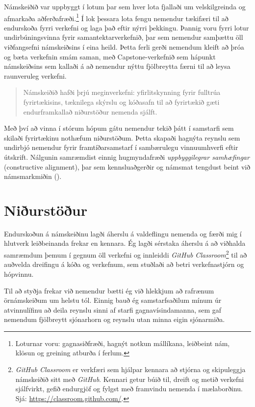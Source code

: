 \documentclass{kennsluakademia_conf}
\begin{document}
Námskeiðið var uppbyggt í lotum þar sem hver lota fjallaði um
velskilgreinda og afmarkaða aðferðafræði.\footnote{Loturnar voru:
  gagnasiðfræði, hagnýt notkun mállíkana, leiðbeint nám, klösun og
  greining atburða í ferlum.} Í lok þessara lota fengu nemendur tækifæri
til að endurskoða fyrri verkefni og laga það eftir nýrri þekkingu.
Þannig voru fyrri lotur undirbúningsvinna fyrir samantektarverkefnið,
þar sem nemendur samþættu öll viðfangsefni námskeiðsins í eina heild.
Þetta ferli gerði nemendum kleift að þróa og bæta verkefnin smám saman,
með Capstone-verkefnið sem hápunkt námskeiðsins sem kallaði á að
nemendur nýttu fjölbreytta færni til að leysa raunveruleg verkefni.

\begin{quote}
Námskeiðið hafði þrjú meginverkefni: yfirlitskynning fyrir fulltrúa
fyrirtækisins, tæknilega skýrslu og kóðasafn til að fyrirtækið gæti
endurframkallað niðurstöður nemenda sjálft.
\end{quote}

Með því að vinna í stórum hópum gátu nemendur tekið þátt í samstarfi sem
skilaði fyrirtækinu nothæfum niðurstöðum. Þetta skapaði hagnýta reynslu
sem undirbjó nemendur fyrir framtíðar\-samstarf í sambærulegu
vinnuumhverfi eftir útskrift. Nálgunin samræmdist einnig hugmyndafræði
\emph{uppbyggilegrar samhæfingar} (constructive alignment), þar sem
kennsluaðgerðir og námsmat tengdust beint við námsmarkmiðin
(\citet{biggs_constructive}).

\section{Niðurstöður}\label{niuxf0urstuxf6uxf0ur}

Endurskoðun á námskeiðinu lagði áherslu á valdeflingu nemenda og færði
mig í hlutverk leiðbeinanda frekar en kennara. Ég lagði sérstaka áherslu
á að viðhalda samræmdum þemum í gegnum öll verkefni og innleiddi
\emph{GitHub Classroom}\footnote{\emph{GitHub Classroom} er verkfæri sem
  hjálpar kennara að stjórna og skipuleggja námskeiðið sitt með
  \emph{GitHub}. Kennari getur búið til, dreift og metið verkefni
  sjálfvirkt, gefið endurgjöf og fylgst með framvindu nemenda í
  mælaborðinu. Sjá: \url{https://classroom.github.com/}.} til að
auðvelda dreifingu á kóða og verkefnum, sem stuðlaði að betri
verkefnastjórn og hópvinnu.

Til að styðja frekar við nemendur bætti ég við hlekkjum að rafrænum
örnámskeiðum um helstu tól. Einnig bauð ég samstarfsaðilum mínum úr
atvinnulífinu að deila reynslu sinni af starfi gagnavísindamanna, sem
gaf nemendum fjölbreytt sjónarhorn og reynslu utan minna eigin
sjónarmiða.
\end{document}
